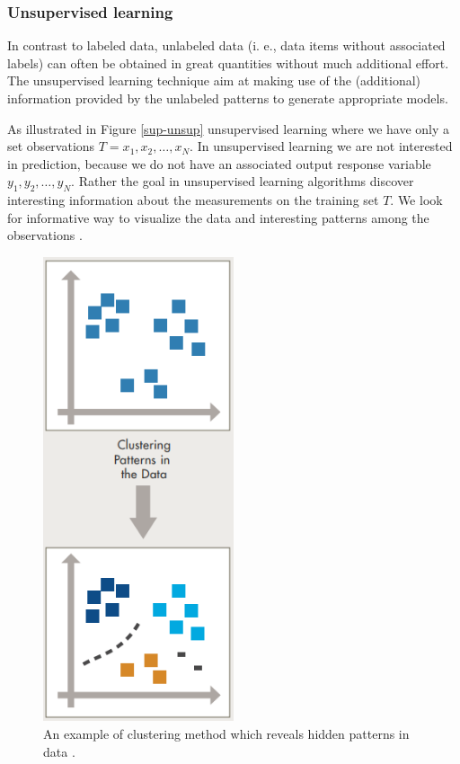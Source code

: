 \subsubsection{Unsupervised learning}

In contrast to labeled data, unlabeled data (i. e., data items without associated labels) can often be obtained in great quantities without much additional effort. The unsupervised learning technique aim at making use of the (additional) information provided by the unlabeled patterns to generate appropriate models. 

As illustrated in Figure \ref{sup-unsup} unsupervised learning where we have only a set observations $T=x_1,x_2,\dots, x_N$. In unsupervised learning we are not interested in prediction, because we do not have an associated output response variable $y_1,y_2,\dots, y_N$. Rather the goal in unsupervised learning algorithms discover interesting information about the measurements on the training set $T$. We look for informative way to visualize the data and interesting patterns among the observations \citep{james2013introduction}. 

\begin{figure}[H]
  \centering
    \includegraphics[width=0.5\textwidth]{images/cluster.png}
    \caption{An example of clustering method which reveals hidden patterns in data \citep{Machinelearning}.}
  \label{datagrowth.png}
\end{figure}


